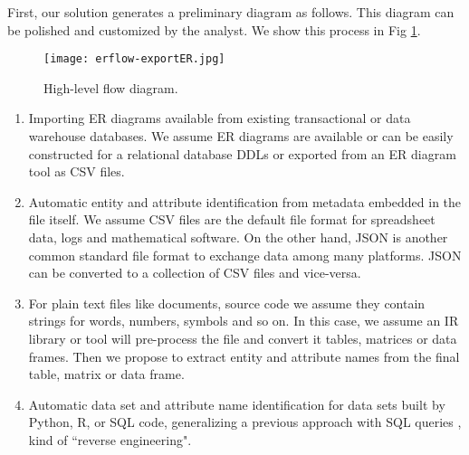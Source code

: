 \documentclass[sigconf,edbt]{acmart-edbt-workshops}
\newcommand{\+}{\discretionary{\mbox{${\bm\cdot}\mkern-1mu$}}{}{}}
\begin{document}

First, our solution generates a preliminary diagram as follows. 
This diagram can be polished and customized by the analyst.
We show this process in Fig \ref{fig:expER}.


\begin{figure}[!hbt]
  \centering
\texttt{[image: erflow-exportER.jpg]}
  \caption{High-level flow diagram.}
  \label{fig:expER}
\end{figure}




\begin{enumerate}
\item Importing ER diagrams available from existing transactional or data warehouse
databases.
We assume ER diagrams are available or can be easily constructed for a relational database DDLs
or exported from an ER diagram tool as CSV files.

\item Automatic entity and attribute identification from metadata embedded in the file itself.
We assume CSV files are the default file format for spreadsheet data,
logs and mathematical software. 
On the other hand, JSON is another common standard file format to exchange data
among many platforms.
JSON can be converted to a collection of CSV files and vice-versa.

\item For plain text files like documents, source code we assume they contain
strings for words, numbers, symbols and so on. In this case, we assume an IR library or tool
will pre-process the file and convert it tables, matrices or data frames.
Then we propose to extract entity and attribute names from the final table, matrix or data frame.

\item Automatic data set and attribute name identification for data sets built by Python, R, or SQL code, generalizing a previous approach with SQL queries \cite{LOBK2019}, kind of ``reverse engineering". 
\end{enumerate}
\end{document}
